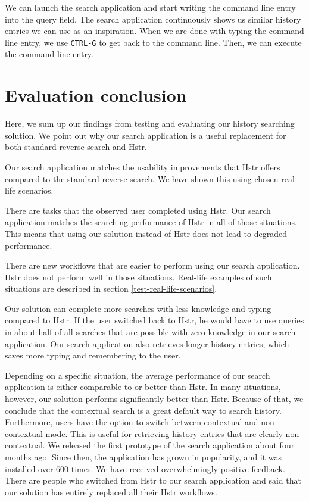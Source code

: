 
We can launch the search application and start writing the command line entry into the query field. The search application continuously shows us similar history entries we can use as an inspiration. When we are done with typing the command line entry, we use \verb|CTRL-G| to get back to the command line. Then, we can execute the command line entry.


\section{Evaluation conclusion}

Here, we sum up our findings from testing and evaluating our history searching solution. We point out why our search application is a useful replacement for both standard reverse search and Hstr. 

Our search application matches the usability improvements that Hstr offers compared to the standard reverse search. We have shown this using chosen real-life scenarios.

There are tasks that the observed user completed using Hstr. Our search application matches the searching performance of Hstr in all of those situations. This means that using our solution instead of Hstr does not lead to degraded performance.

There are new workflows that are easier to perform using our search application. Hstr does not perform well in those situations. Real-life examples of such situations are described in section \ref{test-real-life-scenarios}.

Our solution can complete more searches with less knowledge and typing compared to Hstr. If the user switched back to Hstr, he would have to use queries in about half of all searches that are possible with zero knowledge in our search application. Our search application also retrieves longer history entries, which saves more typing and remembering to the user.

Depending on a specific situation, the average performance of our search application is either comparable to or better than Hstr. In many situations, however, our solution performs significantly better than Hstr. Because of that, we conclude that the contextual search is a great default way to search history. Furthermore, users have the option to switch between contextual and non-contextual mode. This is useful for retrieving history entries that are clearly non-contextual.
We released the first prototype of the search application about four months ago. Since then, the application has grown in popularity, and it was installed over 600 times. We have received overwhelmingly positive feedback. There are people who switched from Hstr to our search application and said that our solution has entirely replaced all their Hstr workflows.



